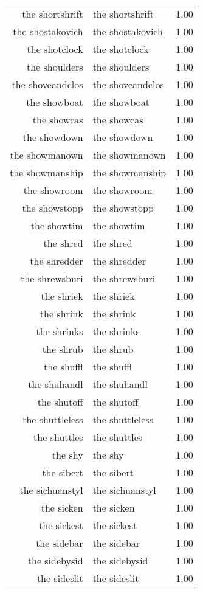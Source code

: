 \begin{table}[ht]
\begin{tabular}{rlr}
  the shortshrift & the shortshrift & 1.00 \\ 
  the shostakovich & the shostakovich & 1.00 \\ 
  the shotclock & the shotclock & 1.00 \\ 
  the shoulders & the shoulders & 1.00 \\ 
  the shoveandclos & the shoveandclos & 1.00 \\ 
  the showboat & the showboat & 1.00 \\ 
  the showcas & the showcas & 1.00 \\ 
  the showdown & the showdown & 1.00 \\ 
  the showmanown & the showmanown & 1.00 \\ 
  the showmanship & the showmanship & 1.00 \\ 
  the showroom & the showroom & 1.00 \\ 
  the showstopp & the showstopp & 1.00 \\ 
  the showtim & the showtim & 1.00 \\ 
  the shred & the shred & 1.00 \\ 
  the shredder & the shredder & 1.00 \\ 
  the shrewsburi & the shrewsburi & 1.00 \\ 
  the shriek & the shriek & 1.00 \\ 
  the shrink & the shrink & 1.00 \\ 
  the shrinks & the shrinks & 1.00 \\ 
  the shrub & the shrub & 1.00 \\ 
  the shuffl & the shuffl & 1.00 \\ 
  the shuhandl & the shuhandl & 1.00 \\ 
  the shutoff & the shutoff & 1.00 \\ 
  the shuttleless & the shuttleless & 1.00 \\ 
  the shuttles & the shuttles & 1.00 \\ 
  the shy & the shy & 1.00 \\ 
  the sibert & the sibert & 1.00 \\ 
  the sichuanstyl & the sichuanstyl & 1.00 \\ 
  the sicken & the sicken & 1.00 \\ 
  the sickest & the sickest & 1.00 \\ 
  the sidebar & the sidebar & 1.00 \\ 
  the sidebysid & the sidebysid & 1.00 \\ 
  the sideslit & the sideslit & 1.00 \\ 

\end{tabular}
\end{table}
